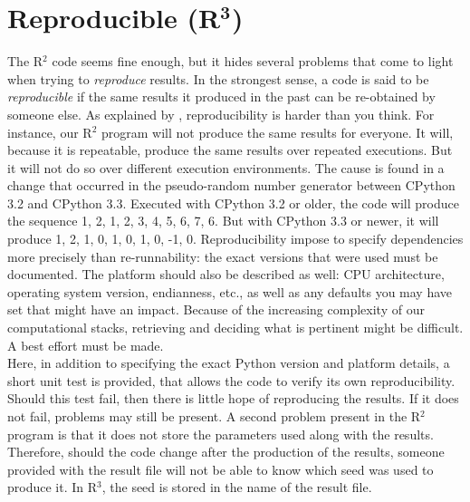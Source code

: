 \documentclass[a4paper,11pt]{article}
\begin{document}


\section*{Reproducible (R$^{\mathbf 3}$)}

The R$^2$ code seems fine enough, but it hides several problems that come to light when trying to {\em reproduce} results.
In the strongest sense, a code is said to be {\em reproducible} if the same results it produced in the past can be re-obtained by someone else.
As explained by \citeauthor{Mesnard:2016} \citep{Mesnard:2016}, reproducibility is harder than you think. 
For instance, our R$^2$ program will not produce the same results for everyone. It will, because it is repeatable, produce the same results over repeated executions.
But it will not do so over different execution environments. The cause is found in a change that occurred in the pseudo-random number generator between CPython 3.2 and CPython 3.3. 
Executed with CPython 3.2 or older, the code will produce the sequence 1, 2, 1, 2, 3, 4, 5, 6, 7, 6. But with CPython 3.3 or newer, it will produce 1, 2, 1, 0, 1, 0, 1, 0, -1, 0.
Reproducibility impose to specify dependencies more precisely than re-runnability: the exact versions that were used must be documented. The platform should also be described as well: CPU architecture, operating system version, endianness, etc., as well as any defaults you may have set that might have an impact.
Because of the increasing complexity of our computational stacks, retrieving and deciding what is pertinent might be difficult. A best effort must be made.\\

Here, in addition to specifying the exact Python version and platform details, a short unit test is provided, that allows the code to verify its own reproducibility. Should this test fail, then there is little hope of reproducing the results. If it does not fail, problems may still be present. 
A second problem present in the R$^2$ program is that it does not store the parameters used along with the results. Therefore, should the code change after the production of the results, someone provided with the result file will not be able to know which seed was used to produce it. In R$^3$, the seed is stored in the name of the result file.
\end{document}
